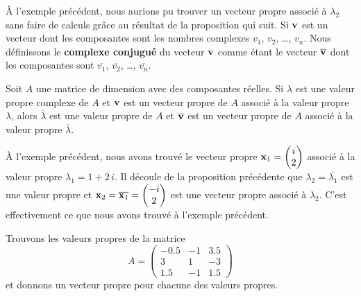 {À l'exemple précédent, nous aurions pu trouver un vecteur propre associé à
$\lambda_2$ sans faire de calculs grâce au résultat de la proposition qui
suit.  Si $\mathbf{v}$ est un vecteur dont les composantes sont les nombres
complexes $v_1$, $v_2$, \ldots, $v_n$.  Nous définissons le
{\bfseries complexe conjugué} du vecteur $\mathbf{v}$ comme étant le vecteur
$\overline{\mathbf{v}}$ dont les composantes sont $\overline{v_1}$,
$\overline{v_2}$, \ldots, $\overline{v_n}$.

\begin{focus}{\prp}
Soit $A$ une matrice de dimension \nn avec des composantes réelles.
Si $\lambda$ est une valeur propre complexe de $A$ et $\mathbf{v}$ est un
vecteur propre de $A$ associé à la valeur propre $\lambda$, alors
$\overline{\lambda}$ est une valeur propre de $A$ et
$\overline{\mathbf{v}}$ est un vecteur propre de $A$ associé à la valeur
propre $\overline{\lambda}$.
\end{focus}

À l'exemple précédent, nous avons trouvé le vecteur propre
$\displaystyle \mathbf{x}_1 = \begin{pmatrix} i \\ 2 \end{pmatrix}$
associé à la valeur propre $\lambda_1=1+2\,i$.  Il découle de la
proposition précédente que $\lambda_2 = \overline{\lambda_1}$ est une
valeur propre et
$\displaystyle \mathbf{x}_2 = \overline{\mathbf{x}_1}
= \begin{pmatrix} -i \\ 2 \end{pmatrix}$
est une vecteur propre associé à $\lambda_2$.  C'est effectivement ce
que nous avons trouvé à l'exemple précédent.

\begin{egg}
Trouvons les valeurs propres de la matrice
\[
A = \begin{pmatrix} -0.5 & -1 & 3.5 \\ 3 & 1 & -3 \\
1.5 & -1 & 1.5 \end{pmatrix}
\]
et donnons un vecteur propre pour chacune des valeurs propres.


\end{egg}}
